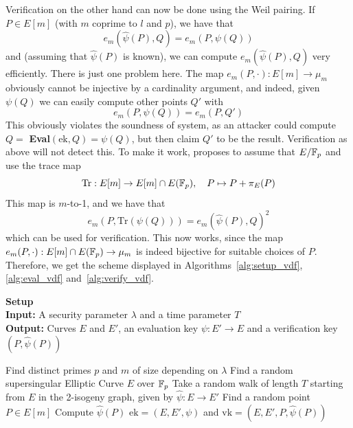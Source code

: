 Verification on the other hand can now be done using the Weil pairing.
If $P \in E[m]$ (with $m$ coprime to $l$ and $p$), we have that
\begin{equation*}
    e_m(\hat{\psi}(P), Q) = e_m(P, \psi(Q))
\end{equation*}
and (assuming that $\hat{\psi}(P)$ is known), we can compute $e_m(\hat{\psi}(P), Q)$ very efficiently.
There is just one problem here.
The map $e_m(P, \cdot): E[m] \to \mu_m$ obviously cannot be injective by a cardinality argument, and indeed, given $\psi(Q)$ we can easily compute other points $Q'$ with
\begin{equation*}
    e_m(P, \psi(Q)) = e_m(P, Q')
\end{equation*}
This obviously violates the soundness of system, as an attacker could compute $Q = $ \textbf{Eval}$(\mathrm{ek}, Q) = \psi(Q)$, but then claim $Q'$ to be the result.
Verification as above will not detect this.
To make it work, \cite{verifiable_delay_function} proposes to assume that $E/\mathbb{F}_p$ and use the trace map
\begin{equation*}
    \mathrm{Tr}: E[m] \to E[m] \cap E(\mathbb{F}_p), \quad P \mapsto P + \pi_E(P)
\end{equation*}
This map is $m$-to-1, and we have that
\begin{equation*}
    e_m(P, \mathrm{Tr}(\psi(Q))) = e_m(\hat{\psi}(P), Q)^2
\end{equation*}
which can be used for verification.
This now works, since the map $e_m(P, \cdot): E[m] \cap E(\mathbb{F}_p) \to \mu_m$ is indeed bijective for suitable choices of $P$.
Therefore, we get the scheme displayed in Algorithms~\ref{alg:setup_vdf}, \ref{alg:eval_vdf} and~\ref{alg:verify_vdf}.
\begin{algorithm}
    \caption{\label{alg:setup_vdf} \textbf{Setup}\\
    \textbf{Input:} A security parameter $\lambda$ and a time parameter $T$\\
    \textbf{Output:} Curves $E$ and $E'$, an evaluation key $\psi: E' \to E$ and a verification key $(P, \hat{\psi}(P))$}
    \begin{algorithmic}[1]
        \State Find distinct primes $p$ and $m$ of size depending on $\lambda$
        \State Find a random supersingular Elliptic Curve $E$ over $\mathbb{F}_p$
        \State Take a random walk of length $T$ starting from $E$ in the 2-isogeny graph, given by $\hat{\psi}: E \to E'$
        \State Find a random point $P \in E[m]$
        \State Compute $\hat{\psi}(P)$
        \State\Return $\mathrm{ek} = (E, E', \psi)$ and $\mathrm{vk} = (E, E', P, \hat{\psi}(P))$
    \end{algorithmic}
\end{algorithm}
